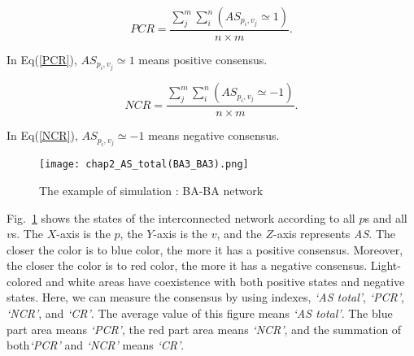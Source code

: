 \begin{equation}
PCR = \frac{{\sum\limits_j^m {\sum\limits_i^n {(A{S_{{p _i},{v _j}}} \simeq  1)} } }}{{n \times m}}.
\label{PCR}
\end{equation}

In Eq(\ref{PCR}),  ${A{S_{{p _i},{v _j}}} \simeq  1}$ means positive consensus.

\begin{equation}
NCR = \frac{{\sum\limits_j^m {\sum\limits_i^n {(A{S_{{p _i},{v _j}}} \simeq   - 1)} } }}{{n \times m}}.
\label{NCR}
\end{equation}

In Eq(\ref{NCR}), ${A{S_{{p _i},{v _j}}} \simeq  -1}$ means negative consensus.


\begin{figure}[!htb]
	\centering
	\texttt{[image: chap2\_AS\_total(BA3\_BA3).png]}
	\caption{The example of simulation : BA-BA network}
	\label{chap2_AS_total(BA3_BA3)}
\end{figure}

Fig.~\ref{chap2_AS_total(BA3_BA3)} shows the states of the interconnected network according to all $p$s and all $v$s. The $X$-axis is the $p$, the $Y$-axis is the $v$, and the $Z$-axis represents \textit{AS}. The closer the color is to blue color, the more it has a positive consensus. Moreover, the closer the color is to red color, the more it has a negative consensus. Light-colored and white areas have coexistence with both positive states and negative states. Here, we can measure the consensus by using indexes, \textit{`AS total'}, \textit{`PCR'}, \textit{`NCR'}, and \textit{`CR'}. The average value of this figure means \textit{`AS total'}. The blue part area means \textit{`PCR'}, the red part area means \textit{`NCR'}, and the summation of both\textit{`PCR'} and \textit{`NCR'} means \textit{`CR'}. \\



    
